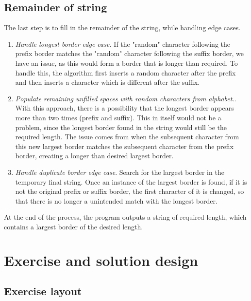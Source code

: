 \documentclass{l4proj}
\begin{document}
\subsection{Remainder of string}
\label{sec:remainder}

The last step is to fill in the remainder of the string, while handling edge cases.

\begin{enumerate}[i]
	\item
	\emph{Handle longest border edge case.}  If the "random" character following the prefix border matches the "random" character following the suffix border, we have an issue, as this would form a border that is longer than required. To handle this, the algorithm first inserts a random character after the prefix and then inserts a character which is different after the suffix.

	\item
	\emph{Populate remaining unfilled spaces with random characters from alphabet.}. With this approach, there is a possibility that the longest border appears more than two times (prefix and suffix). This in itself would not be a problem, since the longest border found in the string would still be the required length. The issue comes from when the subsequent character from this new largest border matches the subsequent character from the prefix border, creating a longer than desired largest border.

	\item
	\emph{Handle duplicate border edge case}. Search for the largest border in the temporary final string. Once an instance of the largest border is found, if it is not the original prefix or suffix border, the first character of it is changed, so that there is no longer a unintended match with the longest border.
\end{enumerate}

At the end of the process, the program outputs a string of required length, which contains a largest border of the desired length.

\section{Exercise and solution design}

\subsection{Exercise layout}
\label{sec:KMPExerciseDesign}
\end{document}

